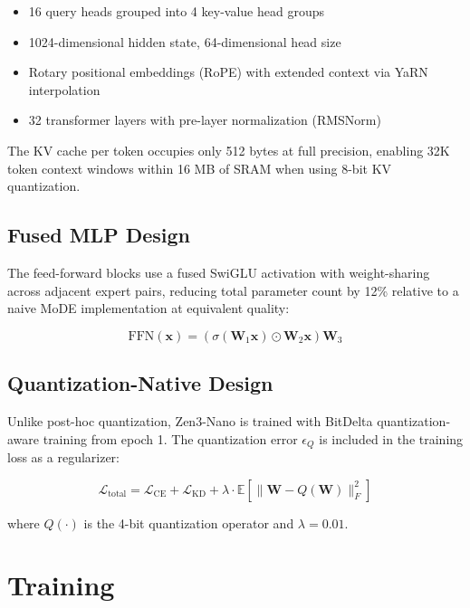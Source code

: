 \documentclass[11pt,a4paper]{article}
\begin{document}
\begin{itemize}
\item 16 query heads grouped into 4 key-value head groups
\item 1024-dimensional hidden state, 64-dimensional head size
\item Rotary positional embeddings (RoPE) with extended context via YaRN interpolation
\item 32 transformer layers with pre-layer normalization (RMSNorm)
\end{itemize}

The KV cache per token occupies only 512 bytes at full precision, enabling 32K token
context windows within 16 MB of SRAM when using 8-bit KV quantization.

\subsection{Fused MLP Design}

The feed-forward blocks use a fused SwiGLU activation with weight-sharing across
adjacent expert pairs, reducing total parameter count by 12\% relative to a naive
MoDE implementation at equivalent quality:

\begin{equation}
\text{FFN}(\mathbf{x}) = \left(\sigma(\mathbf{W}_1 \mathbf{x}) \odot \mathbf{W}_2 \mathbf{x}\right) \mathbf{W}_3
\end{equation}

\subsection{Quantization-Native Design}

Unlike post-hoc quantization, Zen3-Nano is trained with BitDelta quantization-aware
training from epoch 1. The quantization error $\epsilon_Q$ is included in the training
loss as a regularizer:

\begin{equation}
\mathcal{L}_{\text{total}} = \mathcal{L}_{\text{CE}} + \mathcal{L}_{\text{KD}} + \lambda \cdot \mathbb{E}\left[\|\mathbf{W} - Q(\mathbf{W})\|_F^2\right]
\end{equation}

where $Q(\cdot)$ is the 4-bit quantization operator and $\lambda = 0.01$.

\section{Training}
\label{sec:training}
\end{document}
